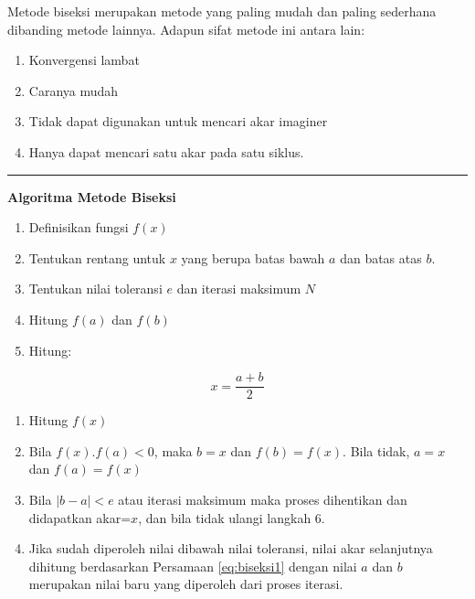 \documentclass[
]{book}
\providecommand{\tightlist}{%
  \setlength{\itemsep}{0pt}\setlength{\parskip}{0pt}}
\theoremstyle{definition}
\theoremstyle{definition}
\theoremstyle{definition}
\theoremstyle{definition}
\theoremstyle{remark}
\begin{document}
Metode biseksi merupakan metode yang paling mudah dan paling sederhana dibanding metode lainnya. Adapun sifat metode ini antara lain:

\begin{enumerate}
\def\labelenumi{\arabic{enumi}.}
\tightlist
\item
  Konvergensi lambat
\item
  Caranya mudah
\item
  Tidak dapat digunakan untuk mencari akar imaginer
\item
  Hanya dapat mencari satu akar pada satu siklus.
\end{enumerate}

\begin{center}\rule{0.5\linewidth}{0.5pt}\end{center}

\textbf{Algoritma Metode Biseksi}

\begin{enumerate}
\def\labelenumi{\arabic{enumi}.}
\tightlist
\item
  Definisikan fungsi \(f\left(x \right)\)
\item
  Tentukan rentang untuk \(x\) yang berupa batas bawah \(a\) dan batas atas \(b\).
\item
  Tentukan nilai toleransi \(e\) dan iterasi maksimum \(N\)
\item
  Hitung \(f\left(a \right)\) dan \(f\left(b \right)\)
\item
  Hitung:
\end{enumerate}

\begin{equation}
x=\frac{a+b}{2}
  \label{eq:biseksi1}
\end{equation}

\begin{enumerate}
\def\labelenumi{\arabic{enumi}.}
\setcounter{enumi}{5}
\tightlist
\item
  Hitung \(f\left(x \right)\)
\item
  Bila \(f\left(x \right).f\left(a \right)<0\), maka \(b=x\) dan \(f\left(b \right)=f\left(x \right)\). Bila tidak, \(a=x\) dan \(f\left(a \right)=f\left(x \right)\)
\item
  Bila \(\left|b-a \right|<e\) atau iterasi maksimum maka proses dihentikan dan didapatkan akar=\(x\), dan bila tidak ulangi langkah 6.
\item
  Jika sudah diperoleh nilai dibawah nilai toleransi, nilai akar selanjutnya dihitung berdasarkan Persamaan \eqref{eq:biseksi1} dengan nilai \(a\) dan \(b\) merupakan nilai baru yang diperoleh dari proses iterasi.
\end{enumerate}
\end{document}

